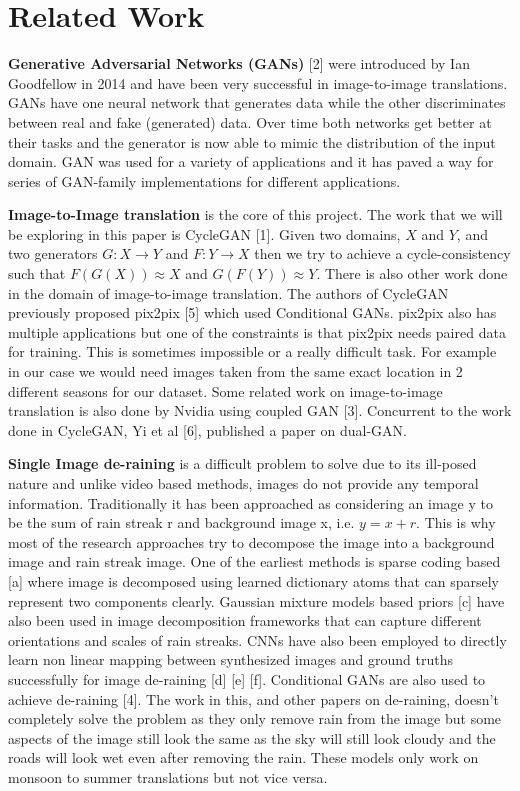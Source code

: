 \documentclass{article}
\begin{document}
\section{Related Work}
\label{relatedworks}

\textbf{Generative Adversarial Networks (GANs)} [2] were introduced by  Ian Goodfellow in 2014 and have been very successful in image-to-image translations. GANs have one neural network that generates data while the other discriminates between real and fake (generated) data. Over time both networks get better at their tasks and the generator is now able to mimic the distribution of the input domain. GAN was used for a variety of applications and it has paved a way for series of GAN-family implementations for different applications.

\textbf{Image-to-Image translation} is the core of this project. The work that we will be exploring in this paper is CycleGAN [1]. Given two domains, $X$ and $Y$, and two generators $G: X \rightarrow Y$ and $F: Y \rightarrow  X$ then we try to achieve a cycle-consistency such that $F(G(X)) \approx X$ and $G(F(Y)) \approx Y$. There is also other work done in the domain of image-to-image translation. The authors of CycleGAN previously proposed pix2pix [5] which used Conditional GANs. pix2pix also has multiple applications but one of the constraints is that pix2pix needs paired data for training. This is sometimes impossible or a really difficult task. For example in our case we would need images taken from the same exact location in 2 different seasons for our dataset. Some related work on image-to-image translation is also done by Nvidia using coupled GAN [3]. Concurrent to the work done in CycleGAN, Yi et al [6], published a paper on dual-GAN.

\textbf{Single Image de-raining} is a difficult problem to solve due to its ill-posed nature and unlike video based methods, images do not provide any temporal information. Traditionally it has been approached as considering an image y to be the sum of rain streak r and background image x, i.e. $y = x + r$. This is why most of the research approaches try to decompose the image into a background image and rain streak image. One of the earliest methods is sparse coding based [a] where image is decomposed using learned dictionary atoms that can sparsely represent two components clearly. Gaussian mixture models based priors [c] have also been used in image decomposition frameworks that can capture different orientations and scales of rain streaks. CNNs have also been employed to directly learn non linear mapping between synthesized images and ground truths successfully for image de-raining [d] [e] [f]. Conditional GANs are also used to achieve de-raining [4]. The work in this, and other papers on de-raining, doesn’t completely solve the problem as they only remove rain from the image but some aspects of the image still look the same as the sky will still look cloudy and the roads will look wet even after removing the rain. These models only work on monsoon to summer translations but not vice versa.
\end{document}
